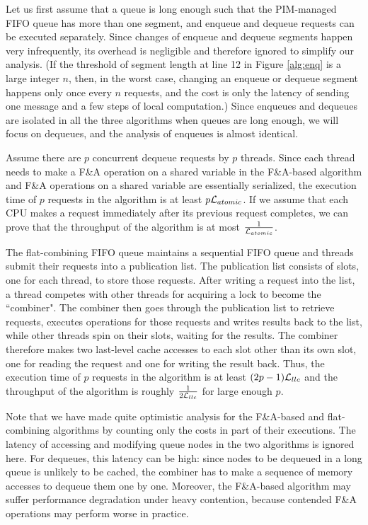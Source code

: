 Let us first assume that a queue is long enough such that the PIM-managed FIFO queue 
has more than one segment, and enqueue and dequeue requests can be executed separately. 
Since changes of enqueue and dequeue segments happen very infrequently, 
its overhead is negligible and therefore ignored to simplify our analysis.
(If the threshold of segment length at line 12 in Figure \ref{alg:enq} is a large integer $n$, 
then, in the worst case, changing an enqueue or dequeue segment happens only once every $n$ requests, 
and the cost is only the latency of sending one message and a few steps of local computation.)
Since enqueues and dequeues are isolated in all the three algorithms when queues are long enough, 
we will focus on dequeues, and the analysis of enqueues is almost identical. 

Assume there are $p$ concurrent dequeue requests by $p$ threads. 
Since each thread needs to make a F\&A operation on a shared variable in the F\&A-based algorithm 
and F\&A operations on a shared variable are essentially serialized, 
the execution time of $p$ requests in the algorithm is at least $p\mathcal{L}_{atomic}$. 
If we assume that each CPU makes a request immediately after its previous request completes, 
we can prove that the throughput of the algorithm is at most ${1 \over \mathcal{L}_{atomic}}$. 

The flat-combining FIFO queue maintains a sequential FIFO queue and 
threads submit their requests into a publication list. 
The publication list consists of slots, one for each thread, to store those requests.
After writing a request into the list, a thread competes with other threads for acquiring a lock 
to become the ``combiner". 
The combiner then goes through the publication list to retrieve requests, executes operations for 
those requests and writes results back to the list, while other threads spin on their slots, 
waiting for the results. 
The combiner therefore makes two last-level cache accesses to each slot other than its own slot, 
one for reading the request and one for writing the result back. 
Thus, the execution time of $p$ requests in the algorithm is at least $(2p-1)\mathcal{L}_{llc}$ and 
the throughput of the algorithm is roughly ${1 \over 2\mathcal{L}_{llc}}$ for large enough $p$.

Note that we have made quite optimistic analysis for the F\&A-based and flat-combining algorithms 
by counting only the costs in part of their executions. 
The latency of accessing and modifying queue nodes in the two algorithms is ignored here. 
For dequeues, this latency can be high: since nodes to be dequeued in a long queue is unlikely 
to be cached, the combiner has to make a sequence of memory accesses to dequeue them one by one.  
Moreover, the F\&A-based algorithm may suffer performance degradation under heavy contention, 
because contended F\&A operations may perform worse in practice.

